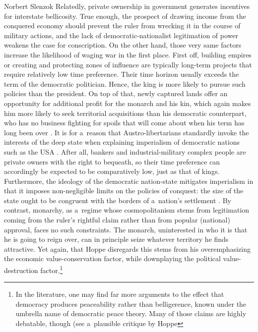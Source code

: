 \begin{artengenv}{Norbert Slenzok}
Relatedly, private ownership in government generates incentives for interstate bellicosity. True enough, the prospect of drawing income from the conquered economy should prevent the ruler from wrecking it in the course of military actions, and the lack of democratic-nationalist legitimation of power weakens the case for conscription. On the other hand, those very same factors increase the likelihood of waging war in the first place. First off, building empires or creating and protecting zones of influence are typically long-term projects that require relatively low time preference. Their time horizon usually exceeds the term of the democratic politician. Hence, the king is more likely to pursue such policies than the president. On top of that, newly captured lands offer an opportunity for additional profit for the monarch and his kin, which again makes him more likely to seek territorial acquisitions than his democratic counterpart, who has no business fighting for spoils that will come about when his term has long been over 
\parencite[][p.121]{mises_liberalism_1985}. %
 It is for a~reason that Austro-libertarians standardly invoke the interests of the deep state when explaining imperialism of democratic nations such as the USA 
\parencites[][]{rothbard_wall_2011}[][pp.77–116]{hoppe_economics_2006}. %
 After all, bankers and industrial-military complex people are private owners with the right to bequeath, so their time preference can accordingly be expected to be comparatively low, just as that of kings. Furthermore, the ideology of the democratic nation-state mitigates imperialism in that it imposes non-negligible limits on the policies of conquest: the size of the state ought to be congruent with the borders of a~nation's settlement 
\parencites[][p.1]{gellner_nations_1993}[][p.118]{mises_liberalism_1985}. %
 By contrast, monarchy, as a~regime whose cosmopolitanism stems from legitimation coming from the ruler's rightful claim rather than from popular (national) approval, faces no such constraints. The monarch, uninterested in who it is that he is going to reign over, can in principle seize whatever territory he finds attractive. Yet again, that Hoppe disregards this stems from his overemphasizing the economic value-conservation factor, while downplaying the political value-destruction factor.\footnote{In the literature, one may find far more arguments to the effect that democracy produces peaceability rather than belligerence, known under the umbrella name of democratic peace theory. Many of those claims are highly debatable, though (see a~plausible critique by Hoppe
}
\end{artengenv}
